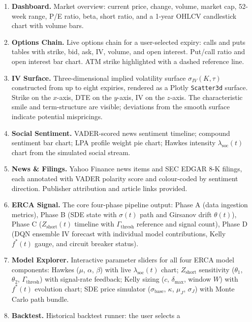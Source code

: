 \documentclass[10pt,twocolumn]{article}
\newcommand{\Zshort}{Z_{\mathrm{short}}}
\newcommand{\lamsoc}{\lambda_{\mathrm{soc}}}
\begin{document}
\begin{enumerate}[leftmargin=*,topsep=2pt,itemsep=1pt]
  \item \textbf{Dashboard.} Market overview: current price, change, volume,
    market cap, 52-week range, P/E ratio, beta, short ratio, and a 1-year
    OHLCV candlestick chart with volume bars.
  \item \textbf{Options Chain.} Live options chain for a user-selected
    expiry: calls and puts tables with strike, bid, ask, IV, volume, and
    open interest. Put/call ratio and open interest bar chart. ATM strike
    highlighted with a dashed reference line.
  \item \textbf{IV Surface.} Three-dimensional implied volatility surface
    $\sigma_{IV}(K,\tau)$ constructed from up to eight expiries, rendered
    as a Plotly \texttt{Scatter3d} surface. Strike on the $x$-axis, DTE
    on the $y$-axis, IV on the $z$-axis. The characteristic smile and
    term-structure are visible; deviations from the smooth surface indicate
    potential mispricings.
  \item \textbf{Social Sentiment.} VADER-scored news sentiment timeline;
    compound sentiment bar chart; LPA profile weight pie chart; Hawkes
    intensity $\lamsoc(t)$ chart from the simulated social stream.
  \item \textbf{News \& Filings.} Yahoo Finance news items and SEC EDGAR
    8-K filings, each annotated with VADER polarity score and colour-coded
    by sentiment direction. Publisher attribution and article links provided.
  \item \textbf{ERCA Signal.} The core four-phase pipeline output:
    Phase A (data ingestion metrics), Phase B (SDE state with $\sigma(t)$
    path and Girsanov drift $\theta(t)$), Phase C ($\Zshort(t)$ timeline
    with $\Gamma_{\mathrm{thresh}}$ reference and signal count), Phase D
    (DQN ensemble IV forecast with individual model contributions, Kelly
    $f^*(t)$ gauge, and circuit breaker status).
  \item \textbf{Model Explorer.} Interactive parameter sliders for all
    four ERCA model components: Hawkes ($\mu$, $\alpha$, $\beta$) with
    live $\lamsoc(t)$ chart; $\Zshort$ sensitivity ($\theta_1$, $\theta_2$,
    $\Gamma_{\mathrm{thresh}}$) with signal-rate feedback; Kelly sizing
    ($c$, $\delta_{\max}$, window $W$) with $f^*(t)$ evolution chart;
    SDE price simulator ($\sigma_{\mathrm{base}}$, $\kappa$, $\mu_J$,
    $\sigma_J$) with Monte Carlo path bundle.
  \item \textbf{Backtest.} Historical backtest runner: the user selects a

\end{enumerate}
\end{document}
